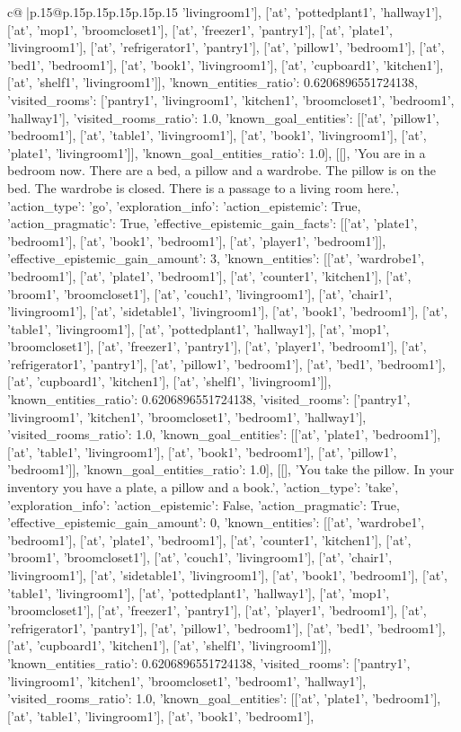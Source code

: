 \documentclass{article}
\begin{document}
{\begin{supertabular}{c@{$\;$}|p{.15\linewidth}@{}p{.15\linewidth}p{.15\linewidth}p{.15\linewidth}p{.15\linewidth}p{.15\linewidth}}
{{{'livingroom1'], ['at', 'pottedplant1', 'hallway1'], ['at', 'mop1', 'broomcloset1'], ['at', 'freezer1', 'pantry1'], ['at', 'plate1', 'livingroom1'], ['at', 'refrigerator1', 'pantry1'], ['at', 'pillow1', 'bedroom1'], ['at', 'bed1', 'bedroom1'], ['at', 'book1', 'livingroom1'], ['at', 'cupboard1', 'kitchen1'], ['at', 'shelf1', 'livingroom1']], 'known_entities_ratio': 0.6206896551724138, 'visited_rooms': ['pantry1', 'livingroom1', 'kitchen1', 'broomcloset1', 'bedroom1', 'hallway1'], 'visited_rooms_ratio': 1.0, 'known_goal_entities': [['at', 'pillow1', 'bedroom1'], ['at', 'table1', 'livingroom1'], ['at', 'book1', 'livingroom1'], ['at', 'plate1', 'livingroom1']], 'known_goal_entities_ratio': 1.0}}], [[], 'You are in a bedroom now. There are a bed, a pillow and a wardrobe. The pillow is on the bed. The wardrobe is closed. There is a passage to a living room here.', {'action_type': 'go', 'exploration_info': {'action_epistemic': True, 'action_pragmatic': True, 'effective_epistemic_gain_facts': [['at', 'plate1', 'bedroom1'], ['at', 'book1', 'bedroom1'], ['at', 'player1', 'bedroom1']], 'effective_epistemic_gain_amount': 3, 'known_entities': [['at', 'wardrobe1', 'bedroom1'], ['at', 'plate1', 'bedroom1'], ['at', 'counter1', 'kitchen1'], ['at', 'broom1', 'broomcloset1'], ['at', 'couch1', 'livingroom1'], ['at', 'chair1', 'livingroom1'], ['at', 'sidetable1', 'livingroom1'], ['at', 'book1', 'bedroom1'], ['at', 'table1', 'livingroom1'], ['at', 'pottedplant1', 'hallway1'], ['at', 'mop1', 'broomcloset1'], ['at', 'freezer1', 'pantry1'], ['at', 'player1', 'bedroom1'], ['at', 'refrigerator1', 'pantry1'], ['at', 'pillow1', 'bedroom1'], ['at', 'bed1', 'bedroom1'], ['at', 'cupboard1', 'kitchen1'], ['at', 'shelf1', 'livingroom1']], 'known_entities_ratio': 0.6206896551724138, 'visited_rooms': ['pantry1', 'livingroom1', 'kitchen1', 'broomcloset1', 'bedroom1', 'hallway1'], 'visited_rooms_ratio': 1.0, 'known_goal_entities': [['at', 'plate1', 'bedroom1'], ['at', 'table1', 'livingroom1'], ['at', 'book1', 'bedroom1'], ['at', 'pillow1', 'bedroom1']], 'known_goal_entities_ratio': 1.0}}], [[], 'You take the pillow. In your inventory you have a plate, a pillow and a book.', {'action_type': 'take', 'exploration_info': {'action_epistemic': False, 'action_pragmatic': True, 'effective_epistemic_gain_amount': 0, 'known_entities': [['at', 'wardrobe1', 'bedroom1'], ['at', 'plate1', 'bedroom1'], ['at', 'counter1', 'kitchen1'], ['at', 'broom1', 'broomcloset1'], ['at', 'couch1', 'livingroom1'], ['at', 'chair1', 'livingroom1'], ['at', 'sidetable1', 'livingroom1'], ['at', 'book1', 'bedroom1'], ['at', 'table1', 'livingroom1'], ['at', 'pottedplant1', 'hallway1'], ['at', 'mop1', 'broomcloset1'], ['at', 'freezer1', 'pantry1'], ['at', 'player1', 'bedroom1'], ['at', 'refrigerator1', 'pantry1'], ['at', 'pillow1', 'bedroom1'], ['at', 'bed1', 'bedroom1'], ['at', 'cupboard1', 'kitchen1'], ['at', 'shelf1', 'livingroom1']], 'known_entities_ratio': 0.6206896551724138, 'visited_rooms': ['pantry1', 'livingroom1', 'kitchen1', 'broomcloset1', 'bedroom1', 'hallway1'], 'visited_rooms_ratio': 1.0, 'known_goal_entities': [['at', 'plate1', 'bedroom1'], ['at', 'table1', 'livingroom1'], ['at', 'book1', 'bedroom1'], }}}
\end{supertabular}}
\end{document}
